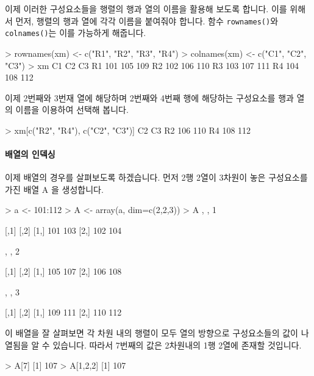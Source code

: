 \documentclass{book}
\begin{document}
이제 이러한 구성요소들을 행렬의 행과 열의 이름을 활용해 보도록 합니다. 
이를 위해서 먼저, 행렬의 행과 열에 각각 이름을 붙여줘야 합니다. 
함수 \texttt{rownames()}와 \texttt{colnames()}는 이를 가능하게 해줍니다.

\begin{Schunk}
\begin{Soutput}
> rownames(xm) <- c("R1", "R2", "R3", "R4")
> colnames(xm) <- c("C1", "C2", "C3")
> xm
    C1  C2  C3
R1 101 105 109
R2 102 106 110
R3 103 107 111
R4 104 108 112
\end{Soutput}
\end{Schunk}

이제 2번째와 3번재 열에 해당하며 2번째와 4번째 행에 해당하는 구성요소를 행과 열의 이름을 이용하여 선택해 봅니다. 

\begin{Schunk}
\begin{Soutput}
> xm[c("R2", "R4"), c("C2", "C3")]
    C2  C3
R2 106 110
R4 108 112
\end{Soutput}
\end{Schunk}


\paragraph{배열의 인덱싱} 이제 배열의 경우를 살펴보도록 하겠습니다. 
먼저 2행 2열이 3차원이 놓은 구성요소를 가진 배열 A 을 생성합니다.

\begin{Schunk}
\begin{Soutput}
> a <- 101:112
> A <- array(a, dim=c(2,2,3))
> A
, , 1

     [,1] [,2]
[1,]  101  103
[2,]  102  104

, , 2

     [,1] [,2]
[1,]  105  107
[2,]  106  108

, , 3

     [,1] [,2]
[1,]  109  111
[2,]  110  112

\end{Soutput}
\end{Schunk}

이 배열을 잘 살펴보면 각 차원 내의 행렬이 모두 열의 방향으로 구성요소들의 값이 나열됨을 알 수 있습니다. 
따라서 7번째의 값은 2차원내의 1행 2열에 존재할 것입니다. 

\begin{Schunk}
\begin{Soutput}
> A[7]
[1] 107
> A[1,2,2]
[1] 107
\end{Soutput}
\end{Schunk}
\end{document}
